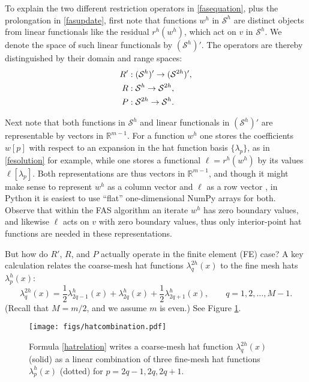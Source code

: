\documentclass[letterpaper,final,12pt,reqno]{amsart}
\newcommand{\RR}{\mathbb{R}}
\begin{document}
To explain the two different restriction operators in \eqref{fasequation}, plus the prolongation in \eqref{fasupdate}, first note that functions $w^h$ in $\mathcal{S}^h$ are distinct objects from linear functionals like the residual $r^h(w^h)$, which act on $v$ in $\mathcal{S}^h$.  We denote the space of such linear functionals by $(\mathcal{S}^h)'$.  The operators are thereby distinguished by their domain and range spaces:
\begin{align}
  R' &: (\mathcal{S}^h)' \to (\mathcal{S}^{2h})', \label{rpoperators} \\
  R  &: \mathcal{S}^h \to \mathcal{S}^{2h}, \notag \\
  P  &: \mathcal{S}^{2h} \to \mathcal{S}^h. \notag
\end{align}

Next note that both functions in $\mathcal{S}^h$ and linear functionals in $(\mathcal{S}^h)'$ are representable by vectors in $\RR^{m-1}$.  For a function $w^h$ one stores the coefficients $w[p]$ with respect to an expansion in the hat function basis $\{\lambda_p\}$, as in \eqref{fesolution} for example, while one stores a functional $\ell=r^h(w^h)$ by its values $\ell[\lambda_p]$.  Both representations are thus vectors in $\RR^{m-1}$, and though it might make sense to represent $w^h$ as a column vector and $\ell$ as a row vector \cite{TrefethenBau1997}, in Python it is easiest to use ``flat'' one-dimensional NumPy arrays for both.  Observe that within the FAS algorithm an iterate $w^h$ has zero boundary values, and likewise $\ell$ acts on $v$ with zero boundary values, thus only interior-point hat functions are needed in these representations.

But how do $R'$, $R$, and $P$ actually operate in the finite element (FE) case?  A key calculation relates the coarse-mesh hat functions $\lambda_q^{2h}(x)$ to the fine mesh hats $\lambda_p^h(x)$:
\begin{equation}
  \lambda_q^{2h}(x) = \frac{1}{2} \lambda_{2q-1}^h(x) + \lambda_{2q}^h(x) + \frac{1}{2} \lambda_{2q+1}^h(x), \qquad q=1,2,\dots,M-1. \label{hatrelation}
\end{equation}
(Recall that $M=m/2$, and we assume $m$ is even.)  See Figure \ref{fig:hatcombination}.

\begin{figure}
\texttt{[image: figs/hatcombination.pdf]}
\caption{Formula \eqref{hatrelation} writes a coarse-mesh hat function $\lambda_q^{2h}(x)$ (solid) as a linear combination of three fine-mesh hat functions $\lambda_p^h(x)$ (dotted) for $p=2q-1,2q,2q+1$.}
\label{fig:hatcombination}
\end{figure}
\end{document}
